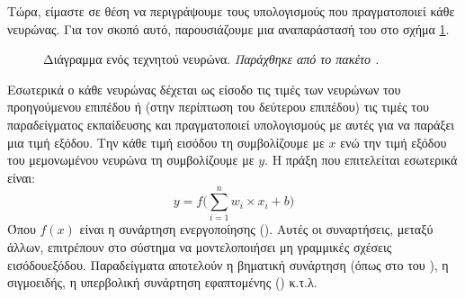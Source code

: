 Τώρα, είμαστε σε θέση να περιγράψουμε τους υπολογισμούς που πραγματοποιεί κάθε νευρώνας. Για τον σκοπό αυτό, παρουσιάζουμε μια αναπαράστασή του στο σχήμα \ref{fig:_neural_node}. \par

\begin{figure}[h]
    \centering
{}
    \caption{Διάγραμμα ενός τεχνητού νευρώνα. \textit{Παράχθηκε από το πακέτο .}}
    \label{fig:_neural_node}
\end{figure}

Εσωτερικά ο κάθε νευρώνας δέχεται ως είσοδο τις τιμές των νευρώνων του προηγούμενου επιπέδου ή (στην περίπτωση του δεύτερου επιπέδου) τις τιμές του παραδείγματος εκπαίδευσης και πραγματοποιεί υπολογισμούς με αυτές για να παράξει μια τιμή εξόδου. Την κάθε τιμή εισόδου τη συμβολίζουμε με $x$ ενώ την τιμή εξόδου του μεμονωμένου νευρώνα τη συμβολίζουμε με $y$. Η πράξη που επιτελείται εσωτερικά είναι:
\begin{equation}
y = f\Big(\sum_{i = 1}^{n} w_i \times x_i  +  b\Big)
\end{equation}
Όπου $f(x)$ είναι η συνάρτηση ενεργοποίησης (). Αυτές οι συναρτήσεις, μεταξύ άλλων, επιτρέπουν στο σύστημα να μοντελοποιήσει μη γραμμικές σχέσεις εισόδου\textendash εξόδου. Παραδείγματα αποτελούν η βηματική συνάρτηση (όπως στο  του  \cite{rosenblatt1958perceptron}), η σιγμοειδής, η υπερβολική συνάρτηση εφαπτομένης () κ.τ.λ. \par

